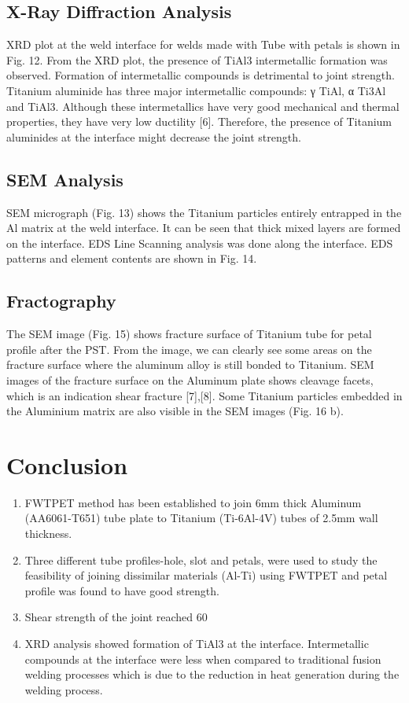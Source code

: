\documentclass[preprint]{elsarticle}
\begin{document}
\subsection{X-Ray Diffraction Analysis}
\label{subsec:XRD-Results}
XRD plot at the weld interface for welds made with Tube with petals is shown in Fig. 12. From the XRD plot, the
presence of TiAl3 intermetallic formation was observed. Formation of intermetallic compounds is detrimental to joint strength. Titanium aluminide has three major intermetallic compounds: γ TiAl, α Ti3Al and TiAl3. Although these intermetallics have very good mechanical and thermal properties, they have very low ductility [6]. Therefore, the presence of Titanium aluminides at the interface might decrease the joint strength.

\subsection{SEM Analysis}
\label{subsec:SEM Analysis}
SEM micrograph (Fig. 13) shows the Titanium particles entirely entrapped in the Al matrix at the weld interface. It can be seen that thick mixed layers are formed on the interface. EDS Line Scanning analysis was done along the interface. EDS patterns and element contents are shown in Fig. 14.

\subsection{Fractography}
\label{subsec:Fractography}
The SEM image (Fig. 15) shows fracture surface of Titanium tube for petal profile after the PST. From the image, we can clearly see some areas on the fracture surface where the aluminum alloy is still bonded to Titanium. SEM images of the fracture surface on the Aluminum plate shows cleavage facets, which is an indication shear fracture [7],[8]. Some Titanium particles embedded in the Aluminium matrix are also visible in
the SEM images (Fig. 16 b).

\section{Conclusion}
\label{sec:Conclusion}
\begin{enumerate}[1.]
\item FWTPET method has been established to join 6mm thick Aluminum (AA6061-T651) tube plate to Titanium (Ti-6Al-4V) tubes of 2.5mm wall thickness.
\item Three different tube profiles-hole, slot and petals, were used to study the feasibility of joining dissimilar materials (Al-Ti) using FWTPET and petal profile was found to have good strength.
\item Shear strength of the joint reached 60%
\item XRD analysis showed formation of TiAl3 at the interface. Intermetallic compounds at the interface were less when compared to traditional fusion welding processes which is due to the reduction in heat generation during the welding process.
\end{enumerate}
\end{document}
